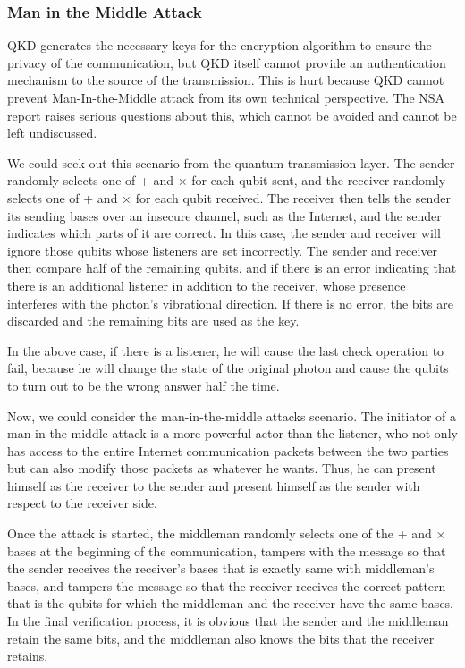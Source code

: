 \documentclass[sigconf]{acmart}
\begin{document}
\subsubsection{Man in the Middle Attack}
QKD generates the necessary keys for the encryption algorithm to ensure the privacy of the communication, but QKD itself cannot provide an authentication mechanism to the source of the transmission. This is hurt because QKD cannot prevent Man-In-the-Middle attack from its own technical perspective. The NSA report raises serious questions about this, which cannot be avoided and cannot be left undiscussed\cite{national_security_agency_nsa_quantum_nodate}.

We could seek out this scenario from the quantum transmission layer. The sender randomly selects one of + and × for each qubit sent, and the receiver randomly selects one of + and × for each qubit received. The receiver then tells the sender its sending bases over an insecure channel, such as the Internet, and the sender indicates which parts of it are correct. In this case, the sender and receiver will ignore those qubits whose listeners are set incorrectly. The sender and receiver then compare half of the remaining qubits, and if there is an error indicating that there is an additional listener in addition to the receiver, whose presence interferes with the photon's vibrational direction. If there is no error, the bits are discarded and the remaining bits are used as the key.

In the above case, if there is a listener, he will cause the last check operation to fail, because he will change the state of the original photon and cause the qubits to turn out to be the wrong answer half the time.

Now, we could consider the man-in-the-middle attacks scenario. The initiator of a man-in-the-middle attack is a more powerful actor than the listener, who not only has access to the entire Internet communication packets between the two parties but can also modify those packets as whatever he wants. Thus, he can present himself as the receiver to the sender and present himself as the sender with respect to the receiver side.

% 
Once the attack is started, the middleman randomly selects one of the + and × bases at the beginning of the communication, tampers with the message so that the sender receives the receiver’s bases that is exactly same with middleman’s bases, and tampers the message so that the receiver receives the correct pattern that is the qubits for which the middleman and the receiver have the same bases. In the final verification process, it is obvious that the sender and the middleman retain the same bits, and the middleman also knows the bits that the receiver retains\cite{fei_quantum_2018}.
\end{document}
